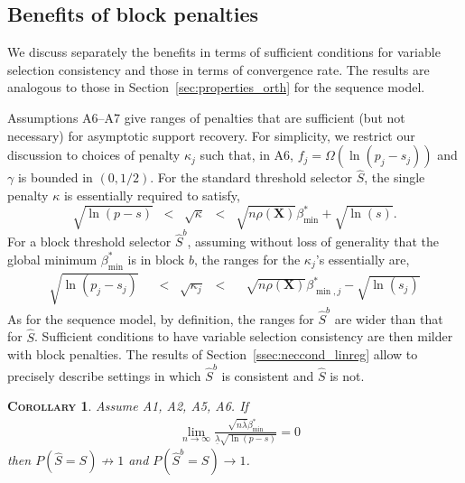 \documentclass[aos]{imsart}
\theoremstyle{plain}
\newtheorem{cor}[thm]{\textsc{Corollary}}
\newcommand{\bs}{\boldsymbol}
\begin{document}
\subsection{Benefits of block penalties}
\label{ssec:regression_gains}

We discuss separately the benefits in terms of sufficient conditions for variable selection consistency and those in terms of convergence rate. The results are analogous to those in Section~\ref{sec:properties_orth} for the sequence model. %

\bigskip

\noindent Assumptions A6--A7 give ranges of penalties that are sufficient (but not necessary) for asymptotic support recovery. For simplicity, we restrict our discussion to choices of penalty $\kappa_j$ such that, in A6, $f_j=\Omega(\ln(p_j-s_j))$ and $\gamma$ is bounded in $(0,1/2)$. For the standard threshold selector $\hat{S}$, the single penalty $\kappa$ is essentially required to satisfy, %
\begin{equation}\label{eq:rangepenex}
  \sqrt{\ln(p-s)}\;\;<\;\;\sqrt{\kappa}\;\;<\;\;\sqrt{n\rho(\bs X)}\beta^*_{\min}+\sqrt{\ln(s)}.	
\end{equation}
For a block threshold selector $\hat{S}^{b}$, assuming without loss of generality that the global minimum $\beta_{\min}^*$ is in block $b$, the ranges for the $\kappa_j$'s essentially are, %
    \begin{eqnarray}\label{eq:rangeblockpenex}
      \sqrt{\ln(p_j-s_j)}\;\;&<\;\;\sqrt{\kappa_j}\;\;<&\;\;\sqrt{n\rho(\bs X)}\beta^*_{\min,j}-\sqrt{\ln(s_j)}
    \end{eqnarray}
As for the sequence model, by definition, the ranges for $\hat S^b$ are wider than that for $\hat S$. Sufficient conditions to have variable selection consistency are then milder with block penalties. The results of Section~\ref{ssec:neccond_linreg} allow to precisely describe settings in which $\hat S^b$ is consistent and $\hat S$ is not.
\begin{cor}\label{cor:selconstimpossiblereg}
Assume A1, A2, A5, A6. If
\begin{eqnarray*}
&\lim_{n\to\infty}\frac{\sqrt{n\bar{\lambda}}\beta_{\min}^*}{\underline{\lambda}\sqrt{\ln(p-s)}} = 0
\end{eqnarray*}
then 
$P(\hat{S} = S)\not \to 1$ and $P(\hat{S}^{b} = S)\to 1$.
\end{cor}
\end{document}
